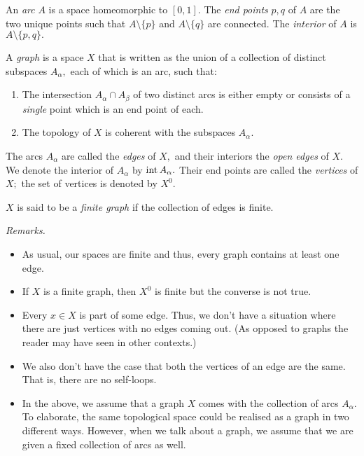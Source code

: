 \documentclass[12pt]{article}
\begin{document}
\begin{defn}[Arc]
	An \emph{arc} $A$ is a space homeomorphic to $[0, 1].$ The \emph{end points} $p, q$ of $A$ are the two unique points such that $A \setminus \{p\}$ and $A \setminus \{q\}$ are connected. The \emph{interior} of $A$ is $A \setminus\{p, q\}.$
\end{defn}

\begin{defn}[Graph]
	A \emph{graph} is a space $X$ that is written as the union of a collection of distinct subspaces $A_\alpha,$ each of which is an arc, such that:
	\begin{enumerate}
		\item The intersection $A_\alpha \cap A_\beta$ of two distinct arcs is either empty or consists of a \emph{single} point which is an end point of each.
		\item The topology of $X$ is coherent with the subspaces $A_\alpha.$
	\end{enumerate}
	The arcs $A_\alpha$ are called the \emph{edges} of $X,$ and their interiors the \emph{open edges} of $X.$ We denote the interior of $A_\alpha$ by $\operatorname{int} A_\alpha.$ Their end points are called the \emph{vertices} of $X;$ the set of vertices is denoted by $X^0.$

	$X$ is said to be a \emph{finite graph} if the collection of edges is finite.
\end{defn}

\emph{Remarks.} 
\begin{itemize}
	\item As usual, our spaces are finite and thus, every graph contains at least one edge.
	\item If $X$ is a finite graph, then $X^0$ is finite but the converse is not true.
	\item Every $x \in X$ is part of some edge. Thus, we don't have a situation where there are just vertices with no edges coming out. (As opposed to graphs the reader may have seen in other contexts.)
	\item We also don't have the case that both the vertices of an edge are the same. That is, there are no self-loops.
	\item In the above, we assume that a graph $X$ comes with the collection of arcs $A_\alpha.$ To elaborate, the same topological space could be realised as a graph in two different ways. However, when we talk about a graph, we assume that we are given a fixed collection of arcs as well.
\end{itemize}
\end{document}
